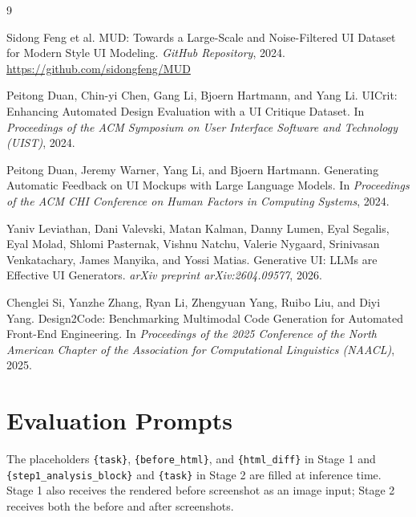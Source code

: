 \documentclass[sigconf,nonacm]{acmart}
\begin{document}

\begin{thebibliography}{9}

Sidong Feng et al.
\newblock MUD: Towards a Large-Scale and Noise-Filtered UI Dataset for Modern Style UI Modeling.
\newblock \textit{GitHub Repository}, 2024.
\newblock \url{https://github.com/sidongfeng/MUD}

Peitong Duan, Chin-yi Chen, Gang Li, Bjoern Hartmann, and Yang Li.
\newblock UICrit: Enhancing Automated Design Evaluation with a UI Critique Dataset.
\newblock In \textit{Proceedings of the ACM Symposium on User Interface Software and Technology (UIST)}, 2024.

Peitong Duan, Jeremy Warner, Yang Li, and Bjoern Hartmann.
\newblock Generating Automatic Feedback on UI Mockups with Large Language Models.
\newblock In \textit{Proceedings of the ACM CHI Conference on Human Factors in Computing Systems}, 2024.

Yaniv Leviathan, Dani Valevski, Matan Kalman, Danny Lumen, Eyal Segalis, Eyal Molad, Shlomi Pasternak, Vishnu Natchu, Valerie Nygaard, Srinivasan Venkatachary, James Manyika, and Yossi Matias.
\newblock Generative UI: LLMs are Effective UI Generators.
\newblock \textit{arXiv preprint arXiv:2604.09577}, 2026.

Chenglei Si, Yanzhe Zhang, Ryan Li, Zhengyuan Yang, Ruibo Liu, and Diyi Yang.
\newblock Design2Code: Benchmarking Multimodal Code Generation for Automated Front-End Engineering.
\newblock In \textit{Proceedings of the 2025 Conference of the North American Chapter of the Association for Computational Linguistics (NAACL)}, 2025.

\end{thebibliography}

\onecolumn
\appendix

\section{Evaluation Prompts}
\label{appendix:prompts}

The placeholders \texttt{\{task\}}, \texttt{\{before\_html\}}, and \texttt{\{html\_diff\}} in Stage 1 and \texttt{\{step1\_analysis\_block\}} and \texttt{\{task\}} in Stage 2 are filled at inference time. Stage 1 also receives the rendered before screenshot as an image input; Stage 2 receives both the before and after screenshots.
\end{document}
